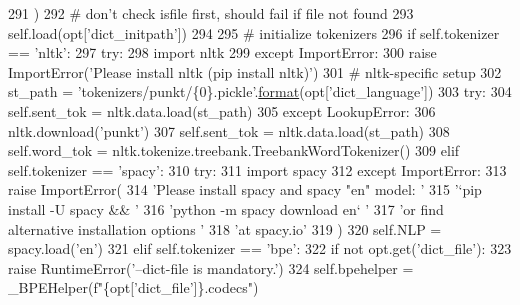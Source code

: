 \begin{DoxyCode}
291                 )
292                 \textcolor{comment}{# don't check isfile first, should fail if file not found}
293                 self.load(opt[\textcolor{stringliteral}{'dict\_initpath'}])
294 
295         \textcolor{comment}{# initialize tokenizers}
296         \textcolor{keywordflow}{if} self.tokenizer == \textcolor{stringliteral}{'nltk'}:
297             \textcolor{keywordflow}{try}:
298                 \textcolor{keyword}{import} nltk
299             \textcolor{keywordflow}{except} ImportError:
300                 \textcolor{keywordflow}{raise} ImportError(\textcolor{stringliteral}{'Please install nltk (pip install nltk)'})
301             \textcolor{comment}{# nltk-specific setup}
302             st\_path = \textcolor{stringliteral}{'tokenizers/punkt/\{0\}.pickle'}.\hyperlink{namespaceparlai_1_1chat__service_1_1services_1_1messenger_1_1shared__utils_a32e2e2022b824fbaf80c747160b52a76}{format}(opt[\textcolor{stringliteral}{'dict\_language'}])
303             \textcolor{keywordflow}{try}:
304                 self.sent\_tok = nltk.data.load(st\_path)
305             \textcolor{keywordflow}{except} LookupError:
306                 nltk.download(\textcolor{stringliteral}{'punkt'})
307                 self.sent\_tok = nltk.data.load(st\_path)
308             self.word\_tok = nltk.tokenize.treebank.TreebankWordTokenizer()
309         \textcolor{keywordflow}{elif} self.tokenizer == \textcolor{stringliteral}{'spacy'}:
310             \textcolor{keywordflow}{try}:
311                 \textcolor{keyword}{import} spacy
312             \textcolor{keywordflow}{except} ImportError:
313                 \textcolor{keywordflow}{raise} ImportError(
314                     \textcolor{stringliteral}{'Please install spacy and spacy "en" model: '}
315                     \textcolor{stringliteral}{'`pip install -U spacy && '}
316                     \textcolor{stringliteral}{'python -m spacy download en` '}
317                     \textcolor{stringliteral}{'or find alternative installation options '}
318                     \textcolor{stringliteral}{'at spacy.io'}
319                 )
320             self.NLP = spacy.load(\textcolor{stringliteral}{'en'})
321         \textcolor{keywordflow}{elif} self.tokenizer == \textcolor{stringliteral}{'bpe'}:
322             \textcolor{keywordflow}{if} \textcolor{keywordflow}{not} opt.get(\textcolor{stringliteral}{'dict\_file'}):
323                 \textcolor{keywordflow}{raise} RuntimeError(\textcolor{stringliteral}{'--dict-file is mandatory.'})
324             self.bpehelper = \_BPEHelper(f\textcolor{stringliteral}{"\{opt['dict\_file']\}.codecs"})

\end{DoxyCode}
